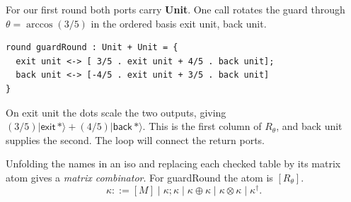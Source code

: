 \documentclass[acmsmall,screen,review,anonymous,nonacm]{acmart}
\newcommand{\storyinlinekwface}{\storyinlineface\bfseries}}
\newcommand{\storyinlineface}{\small\ttfamily}
\newcommand{\storyinlinekwface}{\small\ttfamily\bfseries}
\newcommand{\kw}[1]{\textnormal{\storyinlinekwface #1}}
\newcommand{\code}[1]{\textnormal{\storyinlineface #1}}
\newcommand{\ket}[1]{\lvert #1\rangle}
\numberwithin{equation}{section}
\begin{document}
For our first round both ports carry \kw{Unit}. One call rotates the guard through $\theta=\arccos(3/5)$ in the ordered basis \code{exit unit}, \code{back unit}.
\par\smallskip\noindent\begin{minipage}{.67\linewidth}
\begin{lstlisting}[xleftmargin=0pt]
round guardRound : Unit + Unit = {
  exit unit <-> [ 3/5 . exit unit + 4/5 . back unit];
  back unit <-> [-4/5 . exit unit + 3/5 . back unit]
}
\end{lstlisting}
\end{minipage}\hfill
\begin{minipage}{.32\linewidth}\raggedleft
{}
\end{minipage}\par\smallskip

On \code{exit unit} the dots scale the two outputs, giving $(3/5)\ket{\mathsf{exit}\,*}+(4/5)\ket{\mathsf{back}\,*}$.
This is the first column of $R_\theta$, and \code{back unit} supplies the second. The loop will connect the return ports.

Unfolding the names in an iso and replacing each checked table by its matrix atom gives a
\emph{matrix combinator}. For \code{guardRound} the atom is $[R_\theta]$.
\[
  \kappa ::= [M] \mid \kappa;\kappa \mid \kappa\oplus\kappa
              \mid \kappa\otimes\kappa \mid \kappa^\dagger .
\]
\end{document}
